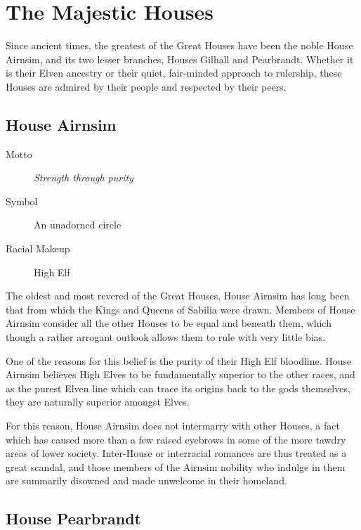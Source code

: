 \documentclass[10pt,twoside,openright,a4paper,twocolumn]{book}
\begin{document}
\section{The Majestic Houses}

Since ancient times, the greatest of the Great Houses have been the noble House
Airnsim, and its two lesser branches, Houses Gilhall and Pearbrandt.  Whether
it is their Elven ancestry or their quiet, fair-minded approach to rulership,
these Houses are admired by their people and respected by their peers.

\subsection*{House Airnsim}

\begin{description}
\item[Motto] \textit{Strength through purity}

\item[Symbol] An unadorned circle

\item[Racial Makeup] High Elf
\end{description}

\noindent
The oldest and most revered of the Great Houses, House Airnsim has long been
that from which the Kings and Queens of Sabilia were drawn.  Members of House
Airnsim consider all the other Houses to be equal and beneath them, which
though a rather arrogant outlook allows them to rule with very little bias.

One of the reasons for this belief is the purity of their High Elf bloodline.
House Airnsim believes High Elves to be fundamentally superior to the other
races, and as the purest Elven line which can trace its origins back to the
gods themselves, they are naturally superior amongst Elves.

For this reason, House Airnsim does not intermarry with other Houses, a fact
which has caused more than a few raised eyebrows in some of the more tawdry
areas of lower society.  Inter-House or interracial romances are thus treated
as a great scandal, and those members of the Airnsim nobility who indulge in
them are summarily disowned and made unwelcome in their homeland.

\subsection*{House Pearbrandt}
\end{document}
